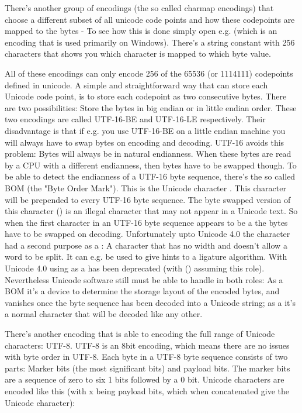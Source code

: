 There's another group of encodings (the so called charmap encodings)
that choose a different subset of all unicode code points and how
these codepoints are mapped to the bytes -
To see how this is done simply open e.g. 
(which is an encoding that is used primarily on Windows).
There's a string constant with 256 characters that shows you which 
character is mapped to which byte value.

All of these encodings can only encode 256 of the 65536 (or 1114111)
codepoints defined in unicode. A simple and straightforward way that
can store each Unicode code point, is to store each codepoint as two
consecutive bytes. There are two possibilities: Store the bytes in big
endian or in little endian order. These two encodings are called
UTF-16-BE and UTF-16-LE respectively. Their disadvantage is that if
e.g. you use UTF-16-BE on a little endian machine you will always have
to swap bytes on encoding and decoding. UTF-16 avoids this problem:
Bytes will always be in natural endianness. When these bytes are read
by a CPU with a different endianness, then bytes have to be swapped
though. To be able to detect the endianness of a UTF-16 byte sequence,
there's the so called BOM (the "Byte Order Mark"). This is the Unicode
character . This character will be prepended to every UTF-16
byte sequence. The byte swapped version of this character () is
an illegal character that may not appear in a Unicode text. So when
the first character in an UTF-16 byte sequence appears to be a 
the bytes have to be swapped on decoding. Unfortunately upto Unicode
4.0 the character  had a second purpose as a : A character that has no width and doesn't allow a
word to be split. It can e.g. be used to give hints to a ligature
algorithm. With Unicode 4.0 using  as a  has been deprecated (with  () assuming
this role). Nevertheless Unicode software still must be able to handle
 in both roles: As a BOM it's a device to determine the storage
layout of the encoded bytes, and vanishes once the byte sequence has
been decoded into a Unicode string; as a 
it's a normal character that will be decoded like any other.

There's another encoding that is able to encoding the full range of
Unicode characters: UTF-8. UTF-8 is an 8bit encoding, which means
there are no issues with byte order in UTF-8. Each byte in a UTF-8
byte sequence consists of two parts: Marker bits (the most significant
bits) and payload bits. The marker bits are a sequence of zero to six
1 bits followed by a 0 bit. Unicode characters are encoded like this
(with x being payload bits, which when concatenated give the Unicode
character):

